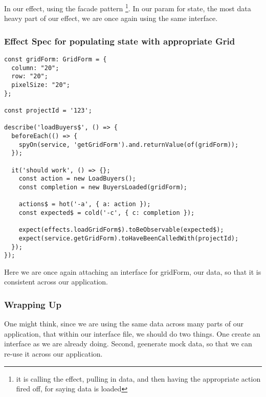 In our effect, using the facade pattern \footnote{it is calling the effect,
pulling in data, and then having the appropriate action fired off, for saying
data is loaded}. In our param for state, the most data heavy part of our effect,
we are once again using the same interface.

\subsubsection{ Effect Spec for populating state with appropriate Grid }
\begin{lstlisting}
const gridForm: GridForm = {
  column: "20";
  row: "20";
  pixelSize: "20";
};

const projectId = '123';

describe('loadBuyers$', () => {
  beforeEach(() => {
    spyOn(service, 'getGridForm').and.returnValue(of(gridForm));
  });

  it('should work', () => {};
    const action = new LoadBuyers();
    const completion = new BuyersLoaded(gridForm);

    actions$ = hot('-a', { a: action });
    const expected$ = cold('-c', { c: completion });

    expect(effects.loadGridForm$).toBeObservable(expected$);
    expect(service.getGridForm).toHaveBeenCalledWith(projectId);
  });
});
\end{lstlisting}

Here we are once again attaching an interface for gridForm, our data, so that it
is consistent across our application.

\subsubsection{Wrapping Up}
One might think, since we are using the same data across many parts of our
application, that within our interface file, we should do two things. One create
an interface as we are already doing. Second, geenerate mock data, so that we
can re-use it across our application. 
